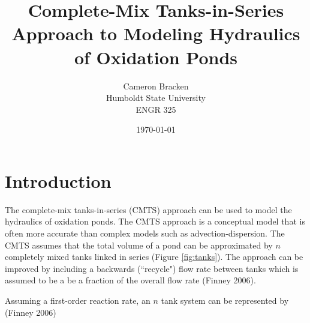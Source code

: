 \documentclass[titlepage,12pt]{article}
\begin{document}
\onehalfspace

\begin{singlespacing}
\title{Complete-Mix Tanks-in-Series Approach to Modeling Hydraulics of Oxidation Ponds}
\author{Cameron Bracken\\Humboldt State University\\ENGR 325}
\date{\today}
\maketitle
\newpage
{}\pagestyle{myheadings}
\tableofcontents{}
\listoffigures {}
\listoftables
\newpage
\end{singlespacing}
\pagestyle{headings}

\section {Introduction}
The complete-mix tanks-in-series (CMTS) approach can be used to
model the hydraulics of oxidation ponds. The CMTS approach is a
conceptual model that is often more accurate than complex models
such as advection-dispersion.  The CMTS assumes that the total
volume of a pond can be approximated by $n$ completely mixed tanks
linked in series (Figure \ref{fig:tanks}).  The approach can be
improved by including a backwards (``recycle") flow rate between
tanks which is assumed to be a be a fraction of the overall flow
rate (Finney 2006).

Assuming a first-order reaction rate, an $n$ tank system can be
represented by (Finney 2006)
\end{document}
